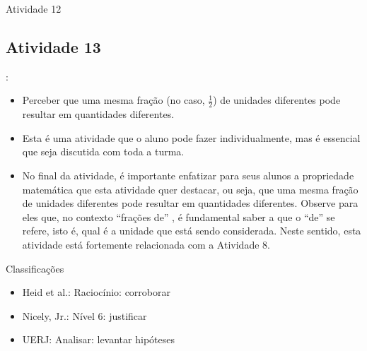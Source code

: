 \begin{multicols}{2}
\begin{resposta*}{Atividade 12}
\end{resposta*}



\subsection{Atividade 13}





  \vspace{.1cm}:

  \begin{itemize} %
    \item       Perceber que uma mesma fração (no caso, $\frac{1}{2}$) de unidades diferentes pode resultar em quantidades diferentes.
\end{itemize} %


  \vspace{.1cm} 
  
  \vspace{.1cm}

  \begin{itemize} %
    \item       Esta é uma atividade que o aluno pode fazer individualmente, mas é essencial que seja discutida com toda a turma.
    \item       No final da atividade, é importante enfatizar para seus alunos a propriedade matemática que esta atividade quer destacar, ou seja, que uma mesma fração de unidades diferentes pode resultar em quantidades diferentes. Observe para eles que, no contexto       ``frações de''      , é fundamental saber a que o       ``de''       se refere, isto é, qual é a unidade que está sendo considerada. Neste sentido, esta atividade está fortemente relacionada com a Atividade 8.
\end{itemize} %


  Classificações
\begin{itemize} %
    \item       Heid et al.: Raciocínio: corroborar
    \item       Nicely, Jr.: Nível 6: justificar
    \item       UERJ: Analisar: levantar hipóteses
\end{itemize} %



\end{multicols}
